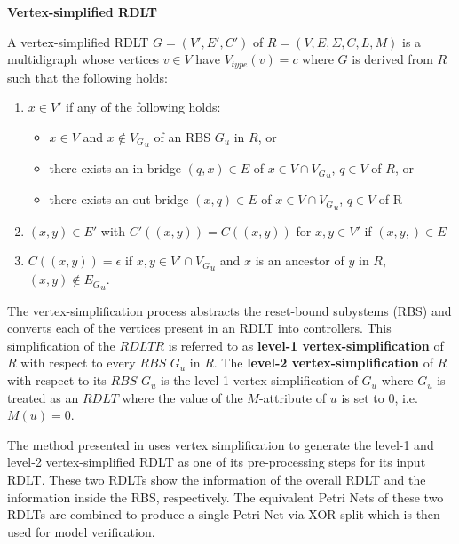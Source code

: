 \documentclass[12pt]{article}
\begin{document}
    \begin{definition} \textbf{Vertex-simplified RDLT} \cite{malinao-rdlt}

    A vertex-simplified RDLT $G = (V',E',C')$ of $ R = (V,E,\Sigma,C,L,M)$ is a multidigraph whose vertices $v \in V$ have $V_{type}(v) = c$ where $G$ is derived from $R$ such that the following holds:

    \begin{enumerate}

        \item $x \in V'$ if any of the following holds:
        \begin{itemize}

            \item $x \in V$ and $x \notin {V_G}_u$ of an RBS $G_u$ in $R$, or

            \item there exists an in-bridge $(q,x) \in E$ of $x \in V \cap {V_G}_u$, $q \in V$ of $R$, or

            \item there exists an out-bridge $(x,q) \in E$ of $x \in V \cap {V_G}_u$, $q \in V$ of R

        \end{itemize}

        \item $(x,y) \in E'$ with $C'((x,y)) = C((x,y))$ for $x,y \in V'$ if $(x,y,) \in E$

        \item $C((x,y)) = \epsilon$ if $x,y \in V' \cap {V_G}_u$ and $x$ is an ancestor of $y$ in $R$, $(x,y) \notin {E_G}_u$.

    \end{enumerate}

    \end{definition}

    The vertex-simplification process abstracts the reset-bound subystems (RBS) and converts each of the vertices present in an RDLT into controllers. This simplification of the $RDLT R$ is referred to as \textbf{level-1 vertex-simplification} of $R$ with respect to every $RBS$ $G_{u}$ in $R$. The \textbf{level-2 vertex-simplification} of $R$ with respect to its $RBS$ $G_{u}$ is the level-1 vertex-simplification of $G_{u}$ where $G_{u}$ is treated as an $RDLT$ where the value of the $M$-attribute of $u$ is set to $0$, i.e. $M(u) = 0$.

    The method presented in  \cite{sulla-malinao} uses vertex simplification to generate the level-1 and level-2 vertex-simplified RDLT as one of its pre-processing steps for its input RDLT. These two RDLTs show the information of the overall RDLT and the information inside the RBS, respectively. The equivalent Petri Nets of these two RDLTs are combined to produce a single Petri Net via XOR split which is then used for model verification.
\end{document}

